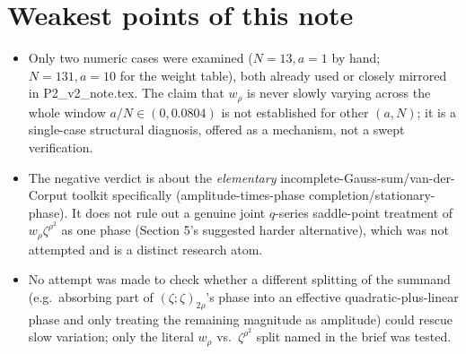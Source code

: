 \documentclass[11pt]{article}
\begin{document}
\section*{Weakest points of this note}
\begin{itemize}
\item Only two numeric cases were examined ($N=13,a=1$ by hand; $N=131,a=10$ for the weight table),
both already used or closely mirrored in P2\_v2\_note.tex. The claim that $w_\rho$ is never slowly
varying across the whole window $a/N\in(0,0.0804)$ is not established for other $(a,N)$; it is a
single-case structural diagnosis, offered as a mechanism, not a swept verification.
\item The negative verdict is about the \emph{elementary} incomplete-Gauss-sum/van-der-Corput toolkit
specifically (amplitude-times-phase completion/stationary-phase). It does not rule out a genuine
joint $q$-series saddle-point treatment of $w_\rho\zeta^{\rho^2}$ as one phase (Section 5's suggested
harder alternative), which was not attempted and is a distinct research atom.
\item No attempt was made to check whether a different splitting of the summand (e.g.\ absorbing part
of $(\zeta;\zeta)_{2\rho}$'s phase into an effective quadratic-plus-linear phase and only treating the
remaining magnitude as amplitude) could rescue slow variation; only the literal $w_\rho$ vs.\
$\zeta^{\rho^2}$ split named in the brief was tested.
\end{itemize}
\end{document}
